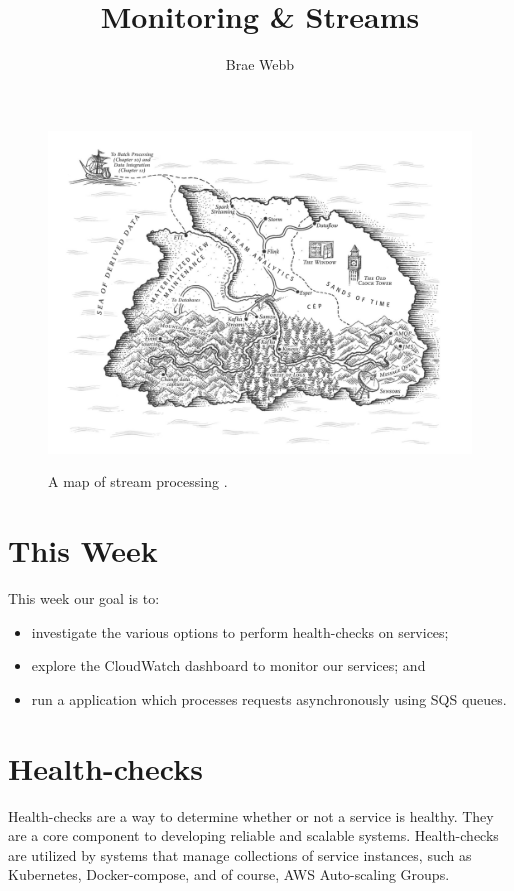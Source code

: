 \documentclass{csse4400}
\title{Monitoring \& Streams}
\author{Brae Webb}
\date{\week{6}}
\begin{document}
\maketitle

\begin{figure}[ht]
  \href{https://www.oreilly.com/library/view/designing-data-intensive-applications/9781491903063/ch11.html}{
    \includegraphics[width=\textwidth]{images/streams}
  }
\caption{A map of stream processing \cite{data-intensive}.}
\end{figure}

\section{This Week}
This week our goal is to:
\begin{itemize}
  \item investigate the various options to perform health-checks on services;
  \item explore the CloudWatch dashboard to monitor our services; and
  \item run a application which processes requests asynchronously using SQS queues.
\end{itemize}


\section{Health-checks}
Health-checks are a way to determine whether or not a service is healthy.
They are a core component to developing reliable and scalable systems.
Health-checks are utilized by systems that manage collections of service instances,
such as Kubernetes, Docker-compose, and of course, AWS Auto-scaling Groups.
\end{document}
